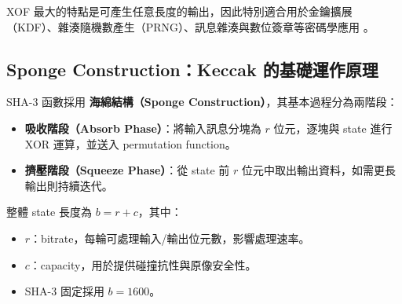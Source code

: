 \documentclass[12pt, a4paper, fleqn]{./styles/ntust_report}
\begin{document}
XOF 最大的特點是可產生任意長度的輸出，因此特別適合用於金鑰擴展（KDF）、雜湊隨機數產生（PRNG）、訊息雜湊與數位簽章等密碼學應用 \cite{FIPS202}。


\begin{table}[htbp]
\centering
\caption{SHA-3 家族分類與安全強度比較}
\end{table}




\subsection{Sponge Construction：Keccak 的基礎運作原理}

SHA-3 函數採用 \textbf{海綿結構（Sponge Construction）}，其基本過程分為兩階段：

\begin{itemize}
    \item \textbf{吸收階段（Absorb Phase）}：將輸入訊息分塊為 $r$ 位元，逐塊與 state 進行 XOR 運算，並送入 permutation function。
    \item \textbf{擠壓階段（Squeeze Phase）}：從 state 前 $r$ 位元中取出輸出資料，如需更長輸出則持續迭代。
\end{itemize}

整體 state 長度為 $b = r + c$，其中：
\begin{itemize}
    \item $r$：bitrate，每輪可處理輸入/輸出位元數，影響處理速率。
    \item $c$：capacity，用於提供碰撞抗性與原像安全性。
    \item SHA-3 固定採用 $b = 1600$。
\end{itemize}
\end{document}
